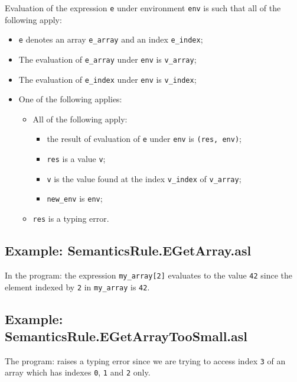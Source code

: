 \documentclass{book}
\begin{document}
  Evaluation of the expression \texttt{e} under environment \texttt{env} is
  such that all of the following apply:
  \begin{itemize}
  \item \texttt{e} denotes an array \texttt{e\_array} and an index \texttt{e\_index};
  \item The evaluation of \texttt{e\_array} under \texttt{env} is \texttt{v\_array};
  \item The evaluation of \texttt{e\_index} under \texttt{env} is \texttt{v\_index};
  \item One of the following applies:
        \begin{itemize}
        \item All of the following apply:
          \begin{itemize}
          \item the result of evaluation of \texttt{e} under \texttt{env} is \texttt{(res, env)};
          \item \texttt{res} is a value \texttt{v};
          \item \texttt{v} is the value found at the index \texttt{v\_index} of \texttt{v\_array};
          \item \texttt{new\_env} is \texttt{env};
          \end{itemize}

        \item \texttt{res} is a typing error.
        \end{itemize}
  \end{itemize}

  \subsection{Example: SemanticsRule.EGetArray.asl}
    In the program:
    the expression \texttt{my\_array[2]} evaluates to the value \texttt{42} since the element
    indexed by \texttt{2} in \texttt{my\_array} is \texttt{42}.

  \subsection{Example: SemanticsRule.EGetArrayTooSmall.asl}
    The program:
    raises a typing error since we are trying to access index \texttt{3} of an array
    which has indexes \texttt{0}, \texttt{1} and \texttt{2} only.
\end{document}
